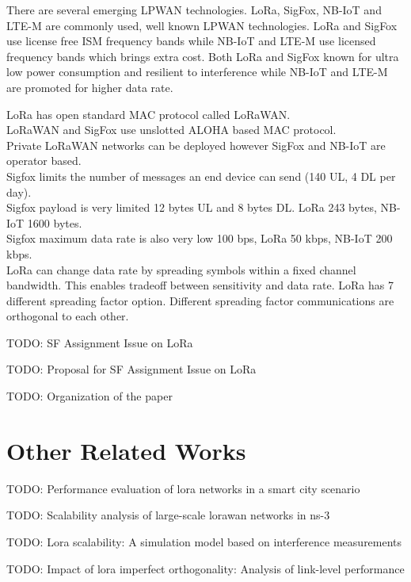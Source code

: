 \documentclass[conference]{IEEEtran}
\begin{document}
\par There are several emerging LPWAN technologies. LoRa, SigFox, NB-IoT and LTE-M are commonly used, well known LPWAN technologies. LoRa and SigFox use license free ISM frequency bands while NB-IoT and LTE-M use licensed frequency bands which brings extra cost. Both LoRa and SigFox known for ultra low power consumption and resilient to interference while NB-IoT and LTE-M are promoted for higher data rate. 

LoRa has open standard MAC protocol called LoRaWAN.\\
LoRaWAN and SigFox use unslotted ALOHA based MAC protocol.\\
Private LoRaWAN networks can be deployed however SigFox and NB-IoT are operator based.\\
Sigfox limits the number of messages an end device can send (140 UL, 4 DL per day).\\
Sigfox payload is very limited 12 bytes UL and 8 bytes DL. LoRa 243 bytes, NB-IoT 1600 bytes.\\
Sigfox maximum data rate is also very low 100 bps, LoRa 50 kbps, NB-IoT 200 kbps.\\
LoRa can change data rate by spreading symbols within a fixed channel bandwidth. This enables tradeoff between sensitivity and data rate. LoRa has 7 different spreading factor option. Different spreading factor communications are orthogonal to each other.

\par TODO: SF Assignment Issue on LoRa

\par TODO: Proposal for SF Assignment Issue on LoRa

\par TODO: Organization of the paper


\section{Other Related Works}
\par TODO: Performance evaluation of lora networks in a smart city scenario\cite{7996384}

\par TODO: Scalability analysis of large-scale lorawan networks in ns-3 \cite{8090518}

\par TODO: Lora scalability: A simulation model based on interference measurements \cite{s17061193}

\par TODO: Impact of lora imperfect orthogonality: Analysis of link-level performance \cite{8267219}
\end{document}
